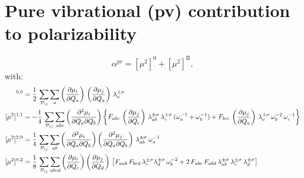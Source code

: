 \documentclass[12pt,a4paper]{article}
\begin{document}
\section{Pure vibrational (pv) contribution to polarizability}
\begin{equation}
\alpha^{pv} = [\mu^2]^0 + [\mu^2]^\text{II},
\end{equation}
with:
\begin{align}
[\mu^2]^{0,0} &= \frac{1}{2}\,\sum_{\mathcal{P}_{ij}} \sum_a \tdiff{\mu_i}{Q_a}\,\tdiff{\mu_j}{Q_a}\,\lb{\sigma}{a}\\
[\mu^2]^{1,1} &= -\frac{1}{4}\,\sum_{\mathcal{P}_{ij}} \sum_{abc} \tdiff{^2\mu_i}{Q_a\partial Q_b}\left\{ F_{abc}\,\tdiff{\mu_j}{Q_c}\,\lb{\sigma}{ab}\,\lb{\sigma}{c}\,(\omega_a^{-1}+\omega_b^{-1})+ F_{bcc}\,\tdiff{\mu_j}{Q_a}\,\lb{\sigma}{a}\,\omega_b^{-2}\,\omega_c^{-1}\right\}\\
[\mu^2]^{2,0} &= \frac{1}{4}\,\sum_{\mathcal{P}_{ij}} \sum_{ab} \tdiff{^2\mu_i}{Q_a\partial Q_b}\tdiff{^2\mu_j}{Q_a\partial Q_b}\,\lb{\sigma}{ab}\,\omega_a^{-1}\\
[\mu^2]^{0,2} &= \frac{1}{8}\,\sum_{\mathcal{P}_{ij}} \sum_{abcd} \tdiff{\mu_i}{Q_c}\tdiff{\mu_j}{Q_d}\,\left[F_{aab}\,F_{bcd}\,\lb{\sigma}{c}\lb{\sigma}{d}\,\omega_b^{-2}+2\,F_{abc}\,F_{abd}\,\lb{\sigma}{ab}\,\lb{\sigma}{c}\,\lb{\sigma}{d}\right]
\end{align}
\end{document}
